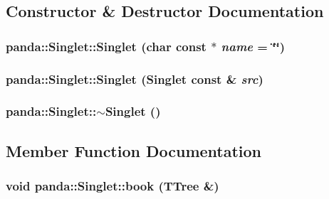 \subsection{Constructor \& Destructor Documentation}
\hypertarget{classpanda_1_1Singlet_a71f83291190ac2789a64d6238f6a5da8}{
\subsubsection[{Singlet}]{\setlength{\rightskip}{0pt plus 5cm}panda::Singlet::Singlet (char const $\ast$ {\em name} = {\ttfamily \char`\"{}\char`\"{}})}}
\label{classpanda_1_1Singlet_a71f83291190ac2789a64d6238f6a5da8}
\hypertarget{classpanda_1_1Singlet_ab8bb799f35abdfff609be48acdc24a88}{
\subsubsection[{Singlet}]{\setlength{\rightskip}{0pt plus 5cm}panda::Singlet::Singlet ({\bf Singlet} const \& {\em src})}}
\label{classpanda_1_1Singlet_ab8bb799f35abdfff609be48acdc24a88}
\hypertarget{classpanda_1_1Singlet_ab40224b05d4f17461959fe352c4d1d29}{
\subsubsection[{$\sim$Singlet}]{\setlength{\rightskip}{0pt plus 5cm}panda::Singlet::$\sim$Singlet ()}}
\label{classpanda_1_1Singlet_ab40224b05d4f17461959fe352c4d1d29}


\subsection{Member Function Documentation}
\hypertarget{classpanda_1_1Singlet_a670d14c939ce004ed6207dcddd0890eb}{
\subsubsection[{book}]{\setlength{\rightskip}{0pt plus 5cm}void panda::Singlet::book (TTree \&)}}
\label{classpanda_1_1Singlet_a670d14c939ce004ed6207dcddd0890eb}


